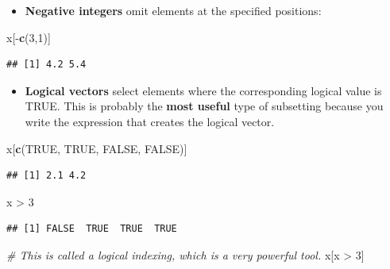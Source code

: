 \documentclass[]{book}
\newenvironment{Shaded}{\begin{snugshade}}{\end{snugshade}}
\newcommand{\KeywordTok}[1]{\textcolor[rgb]{0.13,0.29,0.53}{\textbf{{#1}}}}
\newcommand{\DecValTok}[1]{\textcolor[rgb]{0.00,0.00,0.81}{{#1}}}
\newcommand{\StringTok}[1]{\textcolor[rgb]{0.31,0.60,0.02}{{#1}}}
\newcommand{\CommentTok}[1]{\textcolor[rgb]{0.56,0.35,0.01}{\textit{{#1}}}}
\newcommand{\OtherTok}[1]{\textcolor[rgb]{0.56,0.35,0.01}{{#1}}}
\newcommand{\NormalTok}[1]{{#1}}
\providecommand{\tightlist}{%
  \setlength{\itemsep}{0pt}\setlength{\parskip}{0pt}}
\begin{document}
\begin{itemize}
\tightlist
\item
  \textbf{Negative integers} omit elements at the specified positions:
\end{itemize}

\begin{Shaded}
\begin{Highlighting}[]
\NormalTok{x[-}\KeywordTok{c}\NormalTok{(}\DecValTok{3}\NormalTok{,}\DecValTok{1}\NormalTok{)]}
\end{Highlighting}
\end{Shaded}

\begin{verbatim}
## [1] 4.2 5.4
\end{verbatim}

\begin{itemize}
\tightlist
\item
  \textbf{Logical vectors} select elements where the corresponding
  logical value is TRUE. This is probably the \textbf{most useful} type
  of subsetting because you write the expression that creates the
  logical vector.
\end{itemize}

\begin{Shaded}
\begin{Highlighting}[]
\NormalTok{x[}\KeywordTok{c}\NormalTok{(}\OtherTok{TRUE}\NormalTok{, }\OtherTok{TRUE}\NormalTok{, }\OtherTok{FALSE}\NormalTok{, }\OtherTok{FALSE}\NormalTok{)]}
\end{Highlighting}
\end{Shaded}

\begin{verbatim}
## [1] 2.1 4.2
\end{verbatim}

\begin{Shaded}
\begin{Highlighting}[]
\NormalTok{x >}\StringTok{ }\DecValTok{3}
\end{Highlighting}
\end{Shaded}

\begin{verbatim}
## [1] FALSE  TRUE  TRUE  TRUE
\end{verbatim}

\begin{Shaded}
\begin{Highlighting}[]
\CommentTok{# This is called a logical indexing, which is a very powerful tool.}
\NormalTok{x[x >}\StringTok{ }\DecValTok{3}\NormalTok{]   }
\end{Highlighting}
\end{Shaded}
\end{document}
